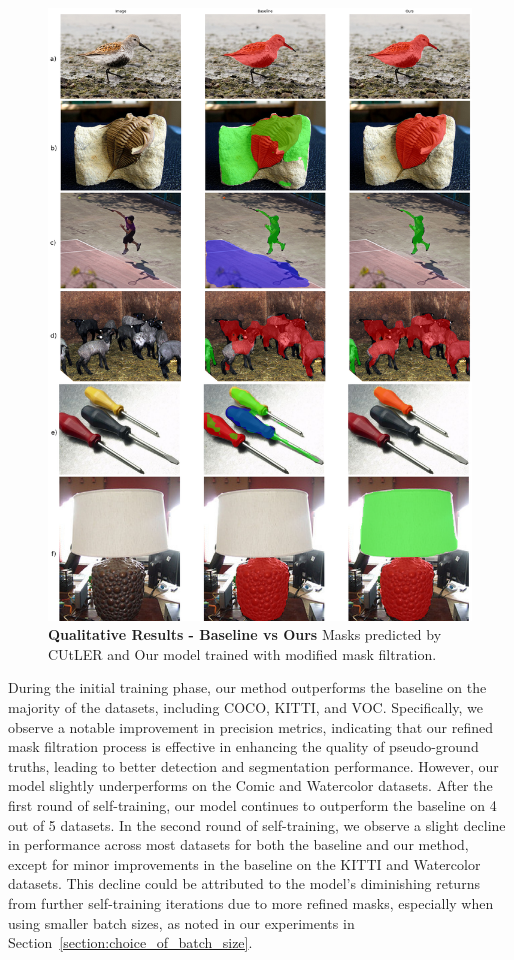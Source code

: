 \begin{figure}
	\centering
	\includegraphics[width=1.05\textwidth]{Images/main/cutler_vs_ours.png}
	\caption[\textbf{Qualitative Results - Baseline vs Ours}]{\textbf{Qualitative Results - Baseline vs Ours} Masks predicted by CUtLER and Our model trained with modified mask filtration.}
	\label{fig:cuter_vs_ours}
\end{figure} 

During the initial training phase, our method outperforms the baseline on the majority of the datasets, including COCO, KITTI, and VOC. Specifically, we observe a notable improvement in precision metrics, indicating that our refined mask filtration process is effective in enhancing the quality of pseudo-ground truths, leading to better detection and segmentation performance. However, our model slightly underperforms on the Comic and Watercolor datasets. After the first round of self-training, our model continues to outperform the baseline on 4 out of 5 datasets. In the second round of self-training, we observe a slight decline in performance across most datasets for both the baseline and our method, except for minor improvements in the baseline on the KITTI and Watercolor datasets. This decline could be attributed to the model’s diminishing returns from further self-training iterations due to more refined masks, especially when using smaller batch sizes, as noted in our experiments in Section~\ref{section:choice_of_batch_size}.

